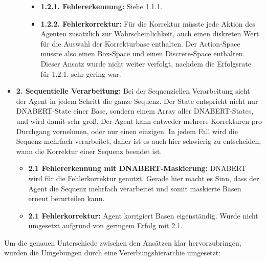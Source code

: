 \documentclass[oneside,bibliography=totocnumbered,BCOR=5mm]{scrbook}%
\theoremstyle{definition}
\theoremstyle{definition}
\theoremstyle{definition}
\theoremstyle{definition}
\theoremstyle{definition}
\theoremstyle{definition}
\begin{document}
\begin{itemize}
\begin{itemize}
    \begin{itemize}
    
      \item \textbf{1.2.1. Fehlererkennung:} Siehe 1.1.1.
    
      \item \textbf{1.2.2. Fehlerkorrektur:} Für die Korrektur müsste jede Aktion des Agenten zusätzlich zur Wahrscheinlichkeit, auch einen diskreten
      Wert für die Auswahl der Korrekturbase enthalten. Der Action-Space müsste also einen Box-Space und einen Discrete-Space enthalten.
      Dieser Ansatz wurde nicht weiter verfolgt, nachdem die Erfolgsrate für 1.2.1. sehr gering war.
      
    \end{itemize}

  \end{itemize}

  \item \textbf{2. Sequentielle Verarbeitung:} Bei der Sequenziellen Verarbeitung sieht der Agent in jedem Schritt die ganze Sequenz. Der State entspricht 
  nicht nur DNABERT-State einer Base, sondern einem Array aller DNABERT-States, und wird damit sehr groß.
  Der Agent kann entweder mehrere Korrekturen pro Durchgang vornehmen, oder nur einen einzigen.
  In jedem Fall wird die Sequenz mehrfach verarbeitet, daher ist es auch hier schwierig zu entscheiden, wann die Korrektur einer Sequenz beendet ist.
  
  \begin{itemize}

    \item \textbf{2.1 Fehlererkennung mit DNABERT-Maskierung:} DNABERT wird für die Fehlerkorrektur genutzt. Gerade hier macht es Sinn, dass 
    der Agent die Sequenz mehrfach verarbeitet und somit maskierte Basen erneut berurteilen kann.
    
    \item \textbf{2.1 Fehlerkorrektur:} Agent korrigiert Basen eigenständig. Wurde nicht umgesetzt aufgrund von geringem Erfolg mit 2.1.
    
  \end{itemize}

\end{itemize}

\clearpage

Um die genauen Unterschiede zwischen den Ansätzen klar hervorzubringen, wurden die Umgebungen durch eine Vererbungshierarchie umgesetzt:
\end{document}
